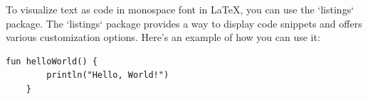 

To visualize text as code in monospace font in LaTeX, you can use the `listings` package. The `listings` package provides a way to display code snippets and offers various customization options. Here's an example of how you can use it:

\begin{lstlisting}[language=XML, style=mystyle]
    fun helloWorld() {
        println("Hello, World!")
    }
\end{lstlisting}